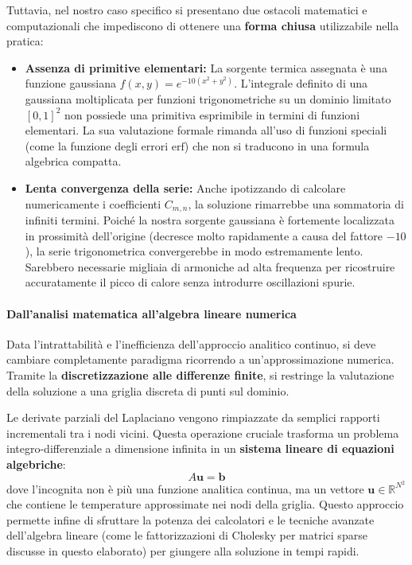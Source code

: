 \documentclass[a4paper,11pt]{article}
\theoremstyle{definition}
\begin{document}
Tuttavia, nel nostro caso specifico si presentano due ostacoli matematici e computazionali che impediscono di ottenere una \textbf{forma chiusa} utilizzabile nella pratica:
\begin{itemize}
    \item \textbf{Assenza di primitive elementari:} La sorgente termica assegnata è una funzione gaussiana $f(x,y) = e^{-10(x^2+y^2)}$. L'integrale definito di una gaussiana moltiplicata per funzioni trigonometriche su un dominio limitato $[0,1]^2$ non possiede una primitiva esprimibile in termini di funzioni elementari. La sua valutazione formale rimanda all'uso di funzioni speciali (come la funzione degli errori $\text{erf}$) che non si traducono in una formula algebrica compatta.
    \item \textbf{Lenta convergenza della serie:} Anche ipotizzando di calcolare numericamente i coefficienti $C_{m,n}$, la soluzione rimarrebbe una sommatoria di infiniti termini. Poiché la nostra sorgente gaussiana è fortemente localizzata in prossimità dell'origine (decresce molto rapidamente a causa del fattore $-10$), la serie trigonometrica convergerebbe in modo estremamente lento. Sarebbero necessarie migliaia di armoniche ad alta frequenza per ricostruire accuratamente il picco di calore senza introdurre oscillazioni spurie.
\end{itemize}

\paragraph{Dall'analisi matematica all'algebra lineare numerica}
Data l'intrattabilità e l'inefficienza dell'approccio analitico continuo, si deve cambiare completamente paradigma ricorrendo a un'approssimazione numerica. Tramite la \textbf{discretizzazione alle differenze finite}, si restringe la valutazione della soluzione a una griglia discreta di punti sul dominio. 

Le derivate parziali del Laplaciano vengono rimpiazzate da semplici rapporti incrementali tra i nodi vicini. Questa operazione cruciale trasforma un problema integro-differenziale a dimensione infinita in un \textbf{sistema lineare di equazioni algebriche}:
\begin{equation}
    A \mathbf{u} = \mathbf{b}
\end{equation}
dove l'incognita non è più una funzione analitica continua, ma un vettore $\mathbf{u} \in \mathbb{R}^{N^2}$ che contiene le temperature approssimate nei nodi della griglia. Questo approccio permette infine di sfruttare la potenza dei calcolatori e le tecniche avanzate dell'algebra lineare (come le fattorizzazioni di Cholesky per matrici sparse discusse in questo elaborato) per giungere alla soluzione in tempi rapidi.
\newpage
\end{document}
